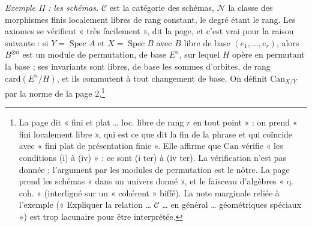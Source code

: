 \documentclass[11pt,a4paper]{article}
\begin{document}
\emph{Exemple II : les schémas.} $\mathcal{C}$ est la catégorie des
schémas, $\mathcal{N}$ la classe des morphismes finis localement libres de
rang constant, le degré étant le rang. Les axiomes se vérifient « très
facilement », dit la page, et c'est vrai pour la raison suivante : si
$Y = \operatorname{Spec} A$ et $X = \operatorname{Spec} B$ avec $B$ libre
de base $(e_1, \ldots, e_r)$, alors $B^{\otimes n}$ est un module de
permutation, de base $E^{n}$, sur lequel $H$ opère en permutant la base ;
ses invariants sont libres, de base les sommes d'orbites, de rang
$\mathrm{card}(E^{n}/H)$, et ils commutent à tout changement de base. On
définit $\mathrm{Can}_{X/Y}$ par la norme de la page 2.\footnote{La page dit
« fini et plat … loc. libre de rang $r$ en tout point » : on prend « fini
localement libre », qui est ce que dit la fin de la phrase et qui coïncide
avec « fini plat de présentation finie ». Elle affirme que $\mathrm{Can}$
vérifie « les conditions (i) à (iv) » : ce sont (i ter) à (iv ter). La
vérification n'est pas donnée ; l'argument par les modules de permutation
est le nôtre. La page prend les schémas « dans un univers donné », et le
faisceau d'algèbres « q. coh. » (interligné sur un « cohérent » biffé). La
note marginale reliée à l'exemple (« Expliquer la relation …
$\mathcal{C}$ … en général … géométriques spéciaux ») est trop lacunaire
pour être interprétée.}
\end{document}
